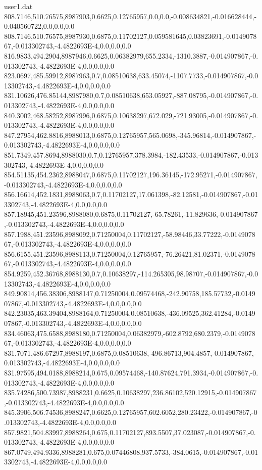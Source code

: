 \begin{filecontents}{user1.dat}
808.7146,510.76575,8987903,0.6625,0.12765957,0.0,0.0,-0.008634821,-0.016628444,-0.040560722,0.0,0.0,0.0
808.7146,510.76575,8987930,0.6875,0.11702127,0.059581645,0.03823691,-0.014907867,-0.013302743,-4.4822693E-4,0.0,0.0,0.0
816.9833,494.2904,8987946,0.6625,0.06382979,655.2334,-1310.3887,-0.014907867,-0.013302743,-4.4822693E-4,0.0,0.0,0.0
823.0697,485.59912,8987963,0.7,0.08510638,633.45074,-1107.7733,-0.014907867,-0.013302743,-4.4822693E-4,0.0,0.0,0.0
831.10626,476.85144,8987980,0.7,0.08510638,653.05927,-887.08795,-0.014907867,-0.013302743,-4.4822693E-4,0.0,0.0,0.0
840.3002,468.58252,8987996,0.6875,0.10638297,672.029,-721.93005,-0.014907867,-0.013302743,-4.4822693E-4,0.0,0.0,0.0
847.27954,462.8816,8988013,0.6875,0.12765957,565.0698,-345.96814,-0.014907867,-0.013302743,-4.4822693E-4,0.0,0.0,0.0
851.7349,457.8694,8988030,0.7,0.12765957,378.3984,-182.43533,-0.014907867,-0.013302743,-4.4822693E-4,0.0,0.0,0.0
854.51135,454.2362,8988047,0.6875,0.11702127,196.36145,-172.95271,-0.014907867,-0.013302743,-4.4822693E-4,0.0,0.0,0.0
856.16614,452.1831,8988063,0.7,0.11702127,17.061398,-82.12581,-0.014907867,-0.013302743,-4.4822693E-4,0.0,0.0,0.0
857.18945,451.23596,8988080,0.6875,0.11702127,-65.78261,-11.829636,-0.014907867,-0.013302743,-4.4822693E-4,0.0,0.0,0.0
857.1988,451.23596,8988092,0.71250004,0.11702127,-58.98446,33.77222,-0.014907867,-0.013302743,-4.4822693E-4,0.0,0.0,0.0
856.6155,451.23596,8988113,0.71250004,0.12765957,-76.26421,81.02371,-0.014907867,-0.013302743,-4.4822693E-4,0.0,0.0,0.0
854.9259,452.36768,8988130,0.7,0.10638297,-114.265305,98.98707,-0.014907867,-0.013302743,-4.4822693E-4,0.0,0.0,0.0
849.90814,456.38306,8988147,0.71250004,0.09574468,-242.90758,185.57732,-0.014907867,-0.013302743,-4.4822693E-4,0.0,0.0,0.0
842.23035,463.39404,8988164,0.71250004,0.08510638,-436.09525,362.41284,-0.014907867,-0.013302743,-4.4822693E-4,0.0,0.0,0.0
834.46063,475.6588,8988180,0.71250004,0.06382979,-602.8792,680.2379,-0.014907867,-0.013302743,-4.4822693E-4,0.0,0.0,0.0
831.7071,486.67297,8988197,0.6875,0.08510638,-496.86713,904.4857,-0.014907867,-0.013302743,-4.4822693E-4,0.0,0.0,0.0
831.97595,494.0188,8988214,0.675,0.09574468,-140.87624,791.3934,-0.014907867,-0.013302743,-4.4822693E-4,0.0,0.0,0.0
835.74286,500.73987,8988231,0.6625,0.10638297,236.86102,520.12915,-0.014907867,-0.013302743,-4.4822693E-4,0.0,0.0,0.0
845.3906,506.74536,8988247,0.6625,0.12765957,602.6052,280.23422,-0.014907867,-0.013302743,-4.4822693E-4,0.0,0.0,0.0
857.9821,504.83997,8988264,0.675,0.11702127,893.5507,37.023087,-0.014907867,-0.013302743,-4.4822693E-4,0.0,0.0,0.0
867.0749,494.9336,8988281,0.675,0.07446808,937.5733,-384.0615,-0.014907867,-0.013302743,-4.4822693E-4,0.0,0.0,0.0

\end{filecontents}
